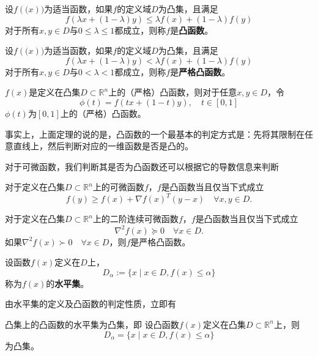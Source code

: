 \begin{definition}[凸函数]
	设$f(\bm(x))$为适当函数，如果$f$的定义域$D$为凸集，且满足
	\begin{equation*}
		f(\lambda x + (1-\lambda )y)\leq \lambda f(x) + (1-\lambda) f(y)
	\end{equation*}
	对于所有$x,y\in D$与$0\leq \lambda \leq 1$都成立，则称$f$是\textbf{凸函数}。
\end{definition}
\begin{definition}[严格凸函数]
	设$f(\bm(x))$为适当函数，如果$f$的定义域$D$为凸集，且满足
	\begin{equation*}
		f(\lambda x + (1-\lambda )y)< \lambda f(x) + (1-\lambda) f(y)
	\end{equation*}
	对于所有$x,y\in D$与$0< \lambda < 1$都成立，则称$f$是\textbf{严格凸函数}。
\end{definition}
\begin{theorem}[凸函数的判定定理]
	$f(x)$是定义在凸集$D\subset \mathbb{R}^n$上的（严格）凸函数，则对于任意$x, y\in D$，令
	\begin{equation*}
		\phi(t) = f(tx + (1-t)y), \quad t\in [0, 1]
	\end{equation*}
	$\phi(t)$为$[0, 1]$上的（严格）凸函数。
\end{theorem}
\begin{note}
	事实上，上面定理的说的是，凸函数的一个最基本的判定方式是：先将其限制在任意直线上，然后判断对应的一维函数是否是凸的。
\end{note}
对于可微函数，我们判断其是否为凸函数还可以根据它的导数信息来判断
\begin{theorem}[一阶条件]
	对于定义在凸集$D\subset \mathbb{R}^n$上的可微函数$f$，$f$是凸函数当且仅当下式成立
	\begin{equation*}
		f(y)\geq f(x) +\nabla f(x)^T(y-x)\quad \forall x, y\in D.
	\end{equation*}
\end{theorem}
\begin{theorem}[二阶条件]
	对于定义在凸集$D\subset \mathbb{R}^n$上的二阶连续可微函数$f$，$f$是凸函数当且仅当下式成立
	\begin{equation*}
		\nabla^2 f(x)\succeq 0\quad \forall x\in D.
	\end{equation*}
	如果$\nabla^2 f(x)\succ 0\quad \forall x\in D$，则$f$是严格凸函数。
\end{theorem}
\begin{definition}[水平集]
设函数$f(x)$定义在$D$上，
	\begin{equation*}
		D_\alpha := \{x\mid x\in D, f(x)\leq \alpha\}
	\end{equation*}
	称为$f(x)$的\textbf{水平集}。
\end{definition}
由水平集的定义及凸函数的判定性质，立即有
\begin{theorem}
	凸集上的凸函数的水平集为凸集，即
	设凸函数$f(x)$定义在凸集$D\subset \mathbb{R}^n$上，则
	\begin{equation*}
		D_\alpha = \{x\mid x\in D, f(x)\leq \alpha\}
	\end{equation*}
	为凸集。
\end{theorem}
